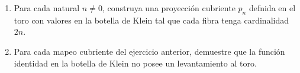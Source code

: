 \begin{enumerate}
\item Para cada natural $n \neq 0$, construya una proyecci\'on cubriente $p_n$ defnida en el toro con
valores en la botella de Klein tal que cada fibra tenga cardinalidad $2n$.\\

\item Para cada mapeo cubriente del ejercicio anterior, demuestre que la funci\'on identidad en la
botella de Klein no posee un levantamiento al toro.\\

\end{enumerate}


